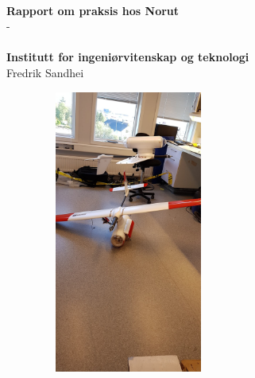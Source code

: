 \documentclass[12pt, a4paper]{article}
\begin{document}
\begin{titlepage}

\HRule \\[0.4cm]
{ \huge \bfseries Rapport om praksis hos Norut}\\[0.4cm] %
{\large {} \hspace{1cm} - \hspace{1cm}}\\[.55cm] %
\HRule \\[1.0 cm]

\textbf{Institutt for ingeniørvitenskap og teknologi}\\
\hspace{-6.3cm} Fredrik Sandhei\\[.25cm] %

\begin{figure}[h!]
	\centering
	\includegraphics[width = 6cm, height = 9.3cm]{bilder/andre_fly_ferdigstilt.jpg}
\end{figure}


\end{titlepage}
\end{document}
